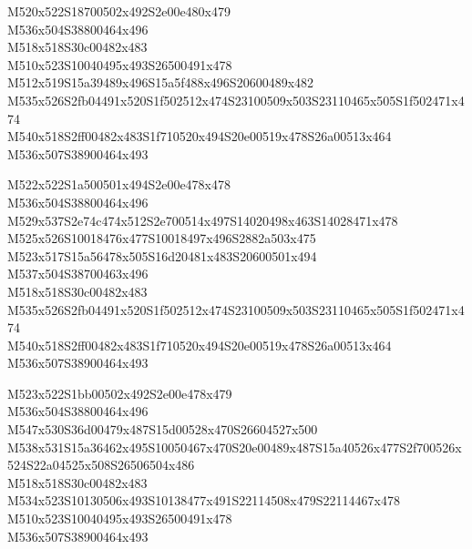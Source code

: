 \documentclass{article}
\begin{document}
\begin{multicols}{5}
\begin{center}

M520x522S18700502x492S2e00e480x479 %
\\M536x504S38800464x496 %
\\M518x518S30c00482x483 %
\\M510x523S10040495x493S26500491x478 %
\\M512x519S15a39489x496S15a5f488x496S20600489x482 %
\\M535x526S2fb04491x520S1f502512x474S23100509x503S23110465x505S1f502471x474 %
\\M540x518S2ff00482x483S1f710520x494S20e00519x478S26a00513x464 %
\\M536x507S38900464x493 %
\vfil
\columnbreak

M522x522S1a500501x494S2e00e478x478 %
\\M536x504S38800464x496 %
\\M529x537S2e74c474x512S2e700514x497S14020498x463S14028471x478 %
\\M525x526S10018476x477S10018497x496S2882a503x475 %
\\M523x517S15a56478x505S16d20481x483S20600501x494 %
\\M537x504S38700463x496 %
\\M518x518S30c00482x483 %
\\M535x526S2fb04491x520S1f502512x474S23100509x503S23110465x505S1f502471x474 %
\\M540x518S2ff00482x483S1f710520x494S20e00519x478S26a00513x464 %
\\M536x507S38900464x493 %
\vfil
\columnbreak

M523x522S1bb00502x492S2e00e478x479 %
\\M536x504S38800464x496 %
\\M547x530S36d00479x487S15d00528x470S26604527x500 %
\\M538x531S15a36462x495S10050467x470S20e00489x487S15a40526x477S2f700526x524S22a04525x508S26506504x486 %
\\M518x518S30c00482x483 %
\\M534x523S10130506x493S10138477x491S22114508x479S22114467x478 %
\\M510x523S10040495x493S26500491x478 %
\\M536x507S38900464x493 %
\vfil
\columnbreak


\end{center}
\end{multicols}
\end{document}
